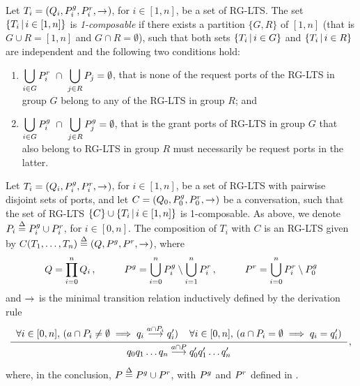 \begin{definition}
  \label{defn:composable}
  Let $T_i = (Q_i, P^{g}_i, P^{r}_i, \stackrel{}{\rightarrow}^{})$, for $i \in [1,n]$, be a set
  of RG-LTS.  The set $\{{T_i}\,|\,{i\in[1,n]}\}$ is {\em 1-composable} if
  there exists a partition $\{G, R\}$ of $[1,n]$ (that is $G \cup R =
  [1,n]$ and $G \cap R = \emptyset$), such that both sets
  $\{{T_i}\,|\,{i\in G}\}$ and $\{{T_i}\,|\,{i\in R}\}$ are independent and the
  following two conditions hold:
  \begin{enumerate}
  \item $\displaystyle\bigcup_{i \in G} P^{r}_i\ \cap\ \bigcup_{j \in R}
    P_j = \emptyset$, that is none of the request
    ports of the RG-LTS in group $G$ belong to any of the RG-LTS in group
    $R$; and
  \item $\displaystyle\bigcup_{i \in G} \pin_i\ \cap\ \bigcup_{j \in R}
    \pin_j = \emptyset$, that is the grant ports of RG-LTS in group $G$
    that also belong to RG-LTS in group $R$ must necessarily be request
    ports in the latter.
  \end{enumerate}
\end{definition}

\begin{definition}
  \label{defn:composition}
  Let $T_i = (Q_i, P^{g}_i, P^{r}_i, \stackrel{}{\rightarrow}^{})$, for $i \in [1,n]$, be a set
  of RG-LTS with pairwise disjoint sets of ports, and let $C = (Q_0,
  P^{g}_0, P^{r}_0, \stackrel{}{\rightarrow}^{})$ be a conversation, such that the set of RG-LTS
  $\{C\}\cup \{{T_i}\,|\,{i\in [1,n]}\}$ is 1-composable.  As above, we
  denote $P_i \stackrel{\Delta}{=} P^{g}_i \cup P^{r}_i$, for $i \in [0,n]$.  The
  composition of $T_i$ with $C$ is an RG-LTS given by $C(T_1,\dots,T_n)
  \stackrel{\Delta}{=} (Q, P^{g}, P^{r}, \stackrel{}{\rightarrow}^{})$, where
  \begin{equation}
    \label{eq:composition:ports}
    Q = \prod_{i=0}^n Q_i\,,
    \hspace{1cm}
    P^{g} = \bigcup_{i=0}^n P^{g}_i \setminus \bigcup_{i=1}^n P^{r}_i\,,
    \hspace{1cm}
    P^{r} = \bigcup_{i=0}^n P^{r}_i \setminus P^{g}_0
  \end{equation}
  and $\stackrel{}{\rightarrow}^{}$ is the minimal transition relation inductively defined by
  the derivation rule
  \begin{equation}
    \label{eq:composition:transitions}
    \renewcommand{\arraystretch}{1.5}
    \derrule[2]{
      \forall i \in [0,n],\, (a \cap P_i \neq \emptyset \implies 
        q_i \longgoesto[a \cap P_i] q_i') &
      \forall i \in [0,n],\, (a \cap P_i = \emptyset \implies q_i = q_i') 
    }{
      q_0 q_1 \dots q_n \longgoesto[a \cap P] q_0' q_1' \dots q_n'
    }\,,
  \end{equation}
  where, in the conclusion, $P \stackrel{\Delta}{=} P^{g} \cup P^{r}$, with $P^{g}$ and
  $P^{r}$ defined in .
\end{definition}

